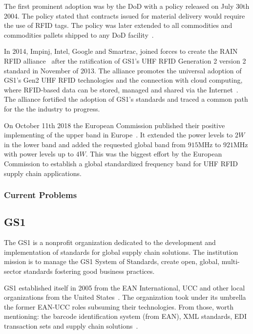 The first prominent adoption was by the \gls{DoD} with a policy released on July 30th 2004. The policy stated that contracts issued for material delivery would require the use of RFID tags. The policy was later extended to all commodities and commodities pallets shipped to any \gls{DoD} facility~\cite{DoDSuppliersPassive, DODReleasesFinal}.

In 2014, Impinj, Intel, Google and Smartrac, joined forces to create the \gls{RAIN RFID} alliance~\cite{TechnologyCompaniesCreate} after the ratification of \gls{GS1}'s \gls{UHF RFID} Generation 2 version 2 standard in November of 2013. The alliance promotes the universal adoption of \gls{GS1}'s Gen2 \gls{UHF RFID} technologies and the connection with \gls{cloud computing}, where RFID-based data can be stored, managed and shared via the Internet~\cite{WhatRAINRFID}.
The alliance fortified the adoption of \gls{GS1}'s standards and traced a common path for the the industry to progress.

On October 11th 2018 the European Commission published their positive implementing of the upper band in Europe~\cite{302208v030101pPdf}.
It extended the power levels to $2W$ in the lower band and added the requested global band from $915$MHz to $921$MHz with power levels up to $4W$. 
This was the biggest effort by the European Commission to establish a global standardized frequency band for \gls{UHF RFID} \gls{supply chain} applications.

\subsubsection{Current Problems}


\subsection{GS1}

The GS1 is a nonprofit organization dedicated to the development and implementation of standards for global \gls{supply chain} solutions. 
The institution mission is to manage the GS1 System of Standards, create open, global, multi-sector standards fostering good business practices.

GS1 established itself in 2005 from the \gls{EAN} International, \gls{UCC} and other local organizations from the United States~\cite{PublicationLEBENSMITTELZEITUNGa}.
The organization took under its umbrella the former EAN-UCC roles subsuming their technologies. From those, worth mentioning: the barcode identification system (from \gls{EAN}), \gls{XML} standards, \gls{EDI} transaction sets and \gls{supply chain} solutions~\cite[p.~212]{lahiriRFIDSourcebook2005}.

